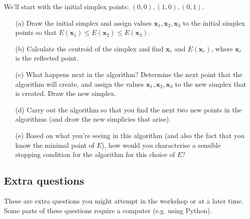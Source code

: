 \documentclass[11pt,a4paper]{scrartcl}
\begin{document}
\begin{enumerate}
We'll start with the initial simplex points: $(0,0), (1,0), (0,1)$.
\begin{enumerate}
    \item[(a)] Draw the initial simplex and assign values $\mathbf{x}_1, \mathbf{x}_2, \mathbf{x}_3$ to the initial simplex points so that $E(\mathbf{x}_1)\leq E(\mathbf{x}_2) \leq E(\mathbf{x}_3)$. 
    \item[(b)] Calculate the centroid of the simplex and find $\mathbf{x}_r$ and $E(\mathbf{x}_r)$, where $\mathbf{x}_r$ is the reflected point. 
    \item[(c)] What happens next in the algorithm? Determine the next point that the algorithm will create, and assign the values $\mathbf{x}_1, \mathbf{x}_2, \mathbf{x}_3$ to the new simplex that is created. Draw the new simplex. 
    \item[(d)] Carry out the algorithm so that you find the next two new points in the algorithms (and draw the new simplicies that arise). 
    \item[(e)] Based on what you're seeing in this algorithm (and also the fact that you know the minimal point of $E$), how would you characterise a sensible stopping condition for the algorithm for this choice of $E$?
\end{enumerate}
\end{enumerate}

\subsection*{Extra questions}

These are extra questions you might attempt in the workshop or at a later time. Some parts of these questions require a computer (e.g. using Python).
\end{document}
